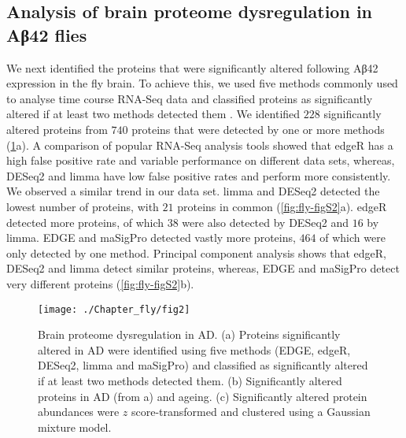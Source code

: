 
\subsection{Analysis of brain proteome dysregulation in Aβ42 flies}

We next identified the proteins that were significantly altered following Aβ42 expression
in the fly brain.
To achieve this, we used five methods commonly used to analyse time course RNA-Seq data
\cite{Anders2010} and classified proteins as significantly altered if at least
two methods detected them \cite{Zhang2014a}.
We identified $228$ significantly altered proteins from $740$ proteins that were detected
by one or more methods (\ref{fig:fly-fig2}a).
A comparison of popular RNA-Seq analysis tools \cite{Seyednasrollah2015} showed that edgeR
\cite{Robinson2010} has a high false positive rate and variable performance on
different data sets, whereas, DESeq2 \cite{Love2014} and limma \cite{Ritchie2015}
have low false positive rates and perform more consistently.
We observed a similar trend in our data set.
limma and DESeq2 detected the lowest number of proteins, with $21$ proteins
in common (\ref{fig:fly-figS2}a).
edgeR detected more proteins, of which $38$ were also detected by DESeq2 and $16$ by limma.
EDGE \cite{Woo2011} and maSigPro \cite{Nueda2014} detected vastly more proteins,
$464$ of which were only detected by one method.
Principal component analysis shows that edgeR, DESeq2 and limma detect similar proteins,
whereas, EDGE and maSigPro detect very different proteins (\ref{fig:fly-figS2}b).

\begin{figure}[!hbt]
    \centering
    \texttt{[image: ./Chapter\_fly/fig2]}
    \caption{%
        Brain proteome dysregulation in AD.
        (a) Proteins significantly altered in AD were identified using five methods
        (EDGE, edgeR, DESeq2, limma and maSigPro) and classified as significantly altered
        if at least two methods detected them.
        (b) Significantly altered proteins in AD (from a) and ageing.
        (c) Significantly altered protein abundances were $z$ score-transformed and
        clustered using a Gaussian mixture model.
    }
    \label{fig:fly-fig2}
\end{figure}

